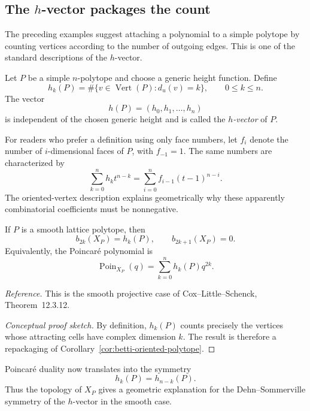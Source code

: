 \subsection{The \texorpdfstring{\(h\)}{h}-vector packages the count}

The preceding examples suggest attaching a polynomial to a simple
polytope by counting vertices according to the number of outgoing
edges. This is one of the standard descriptions of the \(h\)-vector.

\begin{definition}
Let \(P\) be a simple \(n\)-polytope and choose a generic height
function. Define
\[
h_k(P)=\#\{v\in\operatorname{Vert}(P):d_u(v)=k\},
\qquad 0\leq k\leq n.
\]
The vector
\[
h(P)=(h_0,h_1,\ldots,h_n)
\]
is independent of the chosen generic height and is called the
\emph{\(h\)-vector} of \(P\).
\end{definition}

For readers who prefer a definition using only face numbers, let
\(f_i\) denote the number of \(i\)-dimensional faces of \(P\), with
\(f_{-1}=1\). The same numbers are characterized by
\[
\sum_{k=0}^{n}h_k t^{n-k}
=
\sum_{i=0}^{n}f_{i-1}(t-1)^{n-i}.
\]
The oriented-vertex description explains geometrically why these
apparently combinatorial coefficients must be nonnegative.

\begin{theorem}
\label{thm:h-vector-betti-vector}
If \(P\) is a smooth lattice polytope, then
\[
\boxed{
b_{2k}(X_P)=h_k(P),
\qquad
b_{2k+1}(X_P)=0.
}
\]
Equivalently, the Poincar\'e polynomial is
\[
\operatorname{Poin}_{X_P}(q)
=
\sum_{k=0}^{n}h_k(P)q^{2k}.
\]
\end{theorem}

\noindent
\textit{Reference.}
This is the smooth projective case of Cox--Little--Schenck,
Theorem~12.3.12.

\begin{proof}[Conceptual proof sketch]
By definition, \(h_k(P)\) counts precisely the vertices whose attracting
cells have complex dimension \(k\). The result is therefore a
repackaging of Corollary~\ref{cor:betti-oriented-polytope}.
\end{proof}

Poincar\'e duality now translates into the symmetry
\[
h_k(P)=h_{n-k}(P).
\]
Thus the topology of \(X_P\) gives a geometric explanation for the
Dehn--Sommerville symmetry of the \(h\)-vector in the smooth case.

